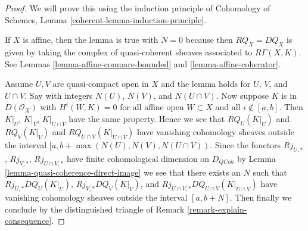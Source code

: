 \documentclass{stacks-project}
\theoremstyle{plain}
\theoremstyle{definition}
\theoremstyle{remark}
\numberwithin{equation}{subsection}
\def\QCoh{\mathit{QCoh}}
\begin{document}
\begin{proof}
We will prove this using the induction principle of
Cohomology of Schemes, Lemma \ref{coherent-lemma-induction-principle}.

\medskip\noindent
If $X$ is affine, then the lemma is true with $N = 0$ because then
$RQ_X = DQ_X$ is given by taking the complex of
quasi-coherent sheaves associated to $R\Gamma(X, K)$.
See Lemmas \ref{lemma-affine-compare-bounded} and \ref{lemma-affine-coherator}.

\medskip\noindent
Assume $U, V$ are quasi-compact open in $X$
and the lemma holds for $U$, $V$, and $U \cap V$.
Say with integers $N(U)$, $N(V)$, and $N(U \cap V)$.
Now suppose $K$ is in $D(\mathcal{O}_X)$ with
$H^i(W, K) = 0$ for all affine open $W \subset X$ and all $i \not \in [a, b]$.
Then $K|_U$, $K|_V$, $K|_{U \cap V}$ have the same property.
Hence we see that $RQ_U(K|_U)$ and $RQ_V(K|_V)$ and
$RQ_{U \cap V}(K|_{U \cap V})$ have vanishing cohomology
sheaves outside the interval $[a, b + \max(N(U), N(V), N(U \cap V))$.
Since the functors $Rj_{U, *}$, $Rj_{V, *}$, $Rj_{U \cap V, *}$
have finite cohomological dimension on $D_\QCoh$ by
Lemma \ref{lemma-quasi-coherence-direct-image}
we see that there exists an $N$ such that
$Rj_{U, *}DQ_U(K|_U)$, $Rj_{V, *}DQ_V(K|_V)$, and
$Rj_{U \cap V, *}DQ_{U \cap V}(K|_{U \cap V})$ have vanishing
cohomology sheaves outside the interval $[a, b + N]$.
Then finally we conclude by the distinguished triangle
of Remark \ref{remark-explain-consequence}.
\end{proof}
\end{document}
